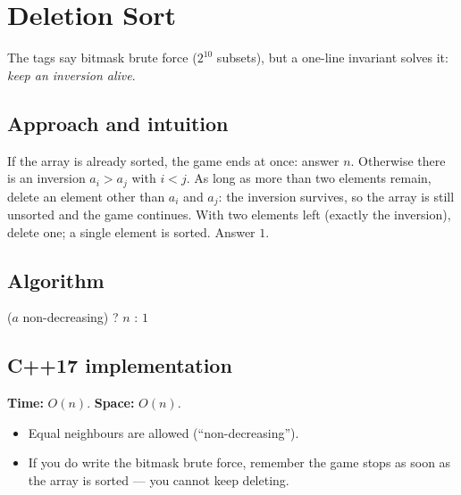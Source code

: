 \section{Deletion Sort}
\label{sec:b-deletion-sort}


\begin{patternbox}
The tags say bitmask brute force ($2^{10}$ subsets), but a one-line
invariant solves it: \emph{keep an inversion alive}.
\end{patternbox}

\subsection*{Approach and intuition}

If the array is already sorted, the game ends at once: answer $n$. Otherwise
there is an inversion $a_i>a_j$ with $i<j$. As long as more than two elements
remain, delete an element other than $a_i$ and $a_j$: the inversion survives,
so the array is still unsorted and the game continues. With two elements left
(exactly the inversion), delete one; a single element is sorted. Answer $1$.

\subsection*{Algorithm}
\begin{algorithmic}[1]
\State \Return ($a$ non-decreasing) ? $n$ : $1$
\end{algorithmic}


\subsection*{C++17 implementation}

\begin{complexitybox}
\textbf{Time:} $O(n)$. \textbf{Space:} $O(n)$.
\end{complexitybox}

\begin{pitfallbox}
\begin{itemize}
  \item Equal neighbours are allowed (``non-decreasing'').
  \item If you do write the bitmask brute force, remember the game stops as
        soon as the array is sorted --- you cannot keep deleting.
\end{itemize}
\end{pitfallbox}
